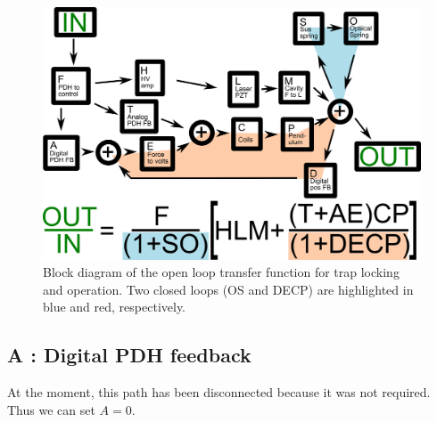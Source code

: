 
\begin{figure}[htbp]
\centering
\includegraphics[width=\columnwidth]{figures/controls/blocks.png}%
\caption[Block diagram of the system]{Block diagram of the open loop transfer function for trap locking and operation. Two closed loops (OS and DECP) are highlighted in blue and red, respectively.}%
\label{fig:blocks}%
\end{figure}





\subsection{A : Digital PDH feedback}

At the moment, this path has been disconnected because it was not required.  Thus we can set $A=0$.

